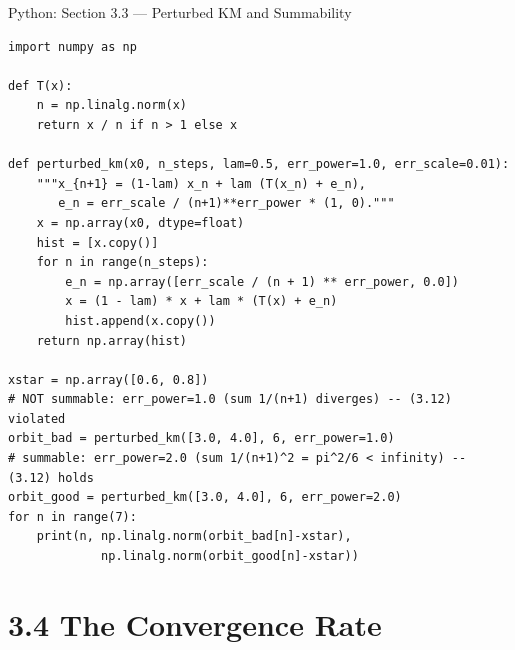 \documentclass[aspectratio=169,10pt]{beamer}
\begin{document}
\begin{frame}[fragile]{Python: Section 3.3 --- Perturbed KM and Summability}
  \begin{lstlisting}[style=python]
import numpy as np

def T(x):
    n = np.linalg.norm(x)
    return x / n if n > 1 else x

def perturbed_km(x0, n_steps, lam=0.5, err_power=1.0, err_scale=0.01):
    """x_{n+1} = (1-lam) x_n + lam (T(x_n) + e_n),
       e_n = err_scale / (n+1)**err_power * (1, 0)."""
    x = np.array(x0, dtype=float)
    hist = [x.copy()]
    for n in range(n_steps):
        e_n = np.array([err_scale / (n + 1) ** err_power, 0.0])
        x = (1 - lam) * x + lam * (T(x) + e_n)
        hist.append(x.copy())
    return np.array(hist)

xstar = np.array([0.6, 0.8])
# NOT summable: err_power=1.0 (sum 1/(n+1) diverges) -- (3.12) violated
orbit_bad = perturbed_km([3.0, 4.0], 6, err_power=1.0)
# summable: err_power=2.0 (sum 1/(n+1)^2 = pi^2/6 < infinity) -- (3.12) holds
orbit_good = perturbed_km([3.0, 4.0], 6, err_power=2.0)
for n in range(7):
    print(n, np.linalg.norm(orbit_bad[n]-xstar),
             np.linalg.norm(orbit_good[n]-xstar))
  \end{lstlisting}
\end{frame}

\section{3.4 The Convergence Rate}
\end{document}
